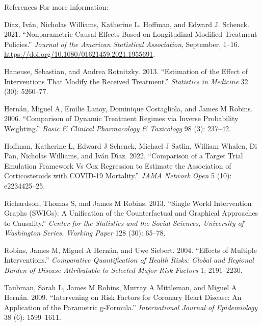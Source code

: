 \documentclass[
  10pt,
  ignorenonframetext,
]{beamer}
\newlength{\cslhangindent}
\newlength{\cslentryspacingunit} %
\newenvironment{CSLReferences}[2] %
 {%
  \setlength{\parindent}{0pt}
  \ifodd #1
  \let\oldpar\par
  \def\par{\hangindent=\cslhangindent\oldpar}
  \fi
  \setlength{\parskip}{#2\cslentryspacingunit}
 }%
 {}
\begin{document}
\begin{frame}{References}
\protect\hypertarget{references}{}
For more information:

\hypertarget{refs}{}
\begin{CSLReferences}{1}{0}
\leavevmode{}%
Díaz, Iván, Nicholas Williams, Katherine L. Hoffman, and Edward J.
Schenck. 2021. {``Nonparametric {Causal} {Effects} {Based} on
{Longitudinal} {Modified} {Treatment} {Policies}.''} \emph{Journal of
the American Statistical Association}, September, 1--16.
\url{https://doi.org/10.1080/01621459.2021.1955691}.

\leavevmode{}%
Haneuse, Sebastian, and Andrea Rotnitzky. 2013. {``Estimation of the
Effect of Interventions That Modify the Received Treatment.''}
\emph{Statistics in Medicine} 32 (30): 5260--77.

\leavevmode{}%
Hernán, Miguel A, Emilie Lanoy, Dominique Costagliola, and James M
Robins. 2006. {``Comparison of Dynamic Treatment Regimes via Inverse
Probability Weighting.''} \emph{Basic \& Clinical Pharmacology \&
Toxicology} 98 (3): 237--42.

\leavevmode{}%
Hoffman, Katherine L, Edward J Schenck, Michael J Satlin, William
Whalen, Di Pan, Nicholas Williams, and Iván Dı́az. 2022. {``Comparison of
a Target Trial Emulation Framework Vs Cox Regression to Estimate the
Association of Corticosteroids with COVID-19 Mortality.''} \emph{JAMA
Network Open} 5 (10): e2234425--25.

\leavevmode{}%
Richardson, Thomas S, and James M Robins. 2013. {``Single World
Intervention Graphs (SWIGs): A Unification of the Counterfactual and
Graphical Approaches to Causality.''} \emph{Center for the Statistics
and the Social Sciences, University of Washington Series. Working Paper}
128 (30): 65--78.

\leavevmode{}%
Robins, James M, Miguel A Hernán, and Uwe Siebert. 2004. {``Effects of
Multiple Interventions.''} \emph{Comparative Quantification of Health
Risks: Global and Regional Burden of Disease Attributable to Selected
Major Risk Factors} 1: 2191--2230.

\leavevmode{}%
Taubman, Sarah L, James M Robins, Murray A Mittleman, and Miguel A
Hernán. 2009. {``Intervening on Risk Factors for Coronary Heart Disease:
An Application of the Parametric g-Formula.''} \emph{International
Journal of Epidemiology} 38 (6): 1599--1611.

\end{CSLReferences}
\end{frame}
\end{document}
